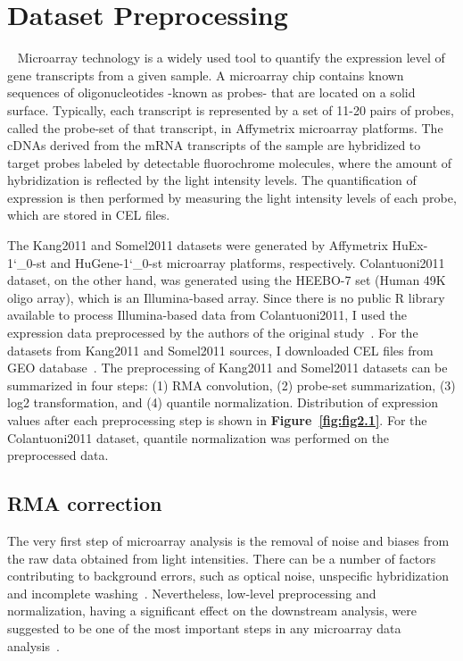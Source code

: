 \section{Dataset Preprocessing}~\label{sec:dset.preprocess}
Microarray technology is a widely used tool to quantify the expression level of gene transcripts from a given sample. 
A microarray chip contains known sequences of oligonucleotides -known as probes- that are located on a solid surface.
Typically, each transcript is represented by a set of 11-20 pairs of probes, called the probe-set of that transcript, in Affymetrix microarray platforms.
The cDNAs derived from the mRNA transcripts of the sample are hybridized to target probes labeled by detectable fluorochrome molecules, 
where the amount of hybridization is reflected by the light intensity levels.
The quantification of expression is then performed by measuring the light intensity levels of each probe, which are stored in CEL files.

The Kang2011 and Somel2011 datasets were generated by Affymetrix HuEx-1\char`_0-st and HuGene-1\char`_0-st microarray platforms, respectively. 
Colantuoni2011 dataset, on the other hand, was generated using the HEEBO-7 set (Human 49K oligo array), which is an Illumina-based array. 
Since there is no public R library available to process Illumina-based data from Colantuoni2011, 
I used the expression data preprocessed by the authors of the original study~\autocite{Colantuoni2011}. 
For the datasets from Kang2011 and Somel2011 sources, I downloaded CEL files from GEO database~\autocite{Barrett2013}. 
The preprocessing of Kang2011 and Somel2011 datasets can be summarized in four steps: (1) RMA convolution, (2) probe-set summarization,
(3) log2 transformation, and (4) quantile normalization. 
Distribution of expression values after each preprocessing step is shown in \textbf{Figure~\ref{fig:fig2.1}}.
For the Colantuoni2011 dataset, quantile normalization was performed on the preprocessed data.

\subsection{RMA correction}
The very first step of microarray analysis is the removal of noise and biases from the raw data obtained from light intensities.
There can be a number of factors contributing to background errors, such as optical noise, unspecific hybridization and incomplete washing~\autocite{Bengtsson2006}. 
Nevertheless, low-level preprocessing and normalization, having a significant effect on the downstream analysis, 
were suggested to be one of the most important steps in any microarray data analysis~\autocite{Bengtsson2006}.

